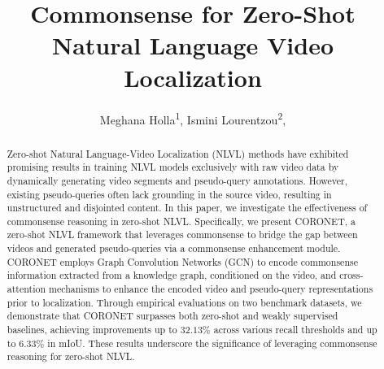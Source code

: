 \documentclass[letterpaper]{article} %
\title{Commonsense for Zero-Shot Natural Language Video Localization}
\author {
    Meghana Holla\textsuperscript{\rm 1},
    Ismini Lourentzou\textsuperscript{\rm 2},
}
\newcommand*{\elbafont}{\fontfamily{augie}\selectfont}
\newcommand*\modelname{{\scriptsize \elbafont CORONET}\xspace}
\begin{document}
\maketitle

\begin{abstract}
Zero-shot Natural Language-Video Localization (NLVL) methods have exhibited promising results in training NLVL models exclusively with raw video data by dynamically generating video segments and pseudo-query annotations.
However, existing pseudo-queries often lack grounding in the source video, resulting in unstructured and disjointed content. In this paper, we investigate the effectiveness of commonsense reasoning in zero-shot NLVL. Specifically, we present \modelname, a zero-shot NLVL framework that leverages commonsense to bridge the gap between videos and generated pseudo-queries via a commonsense enhancement module. \modelname employs Graph Convolution Networks (GCN) to encode commonsense information extracted from a knowledge graph, conditioned on the video, and cross-attention mechanisms to enhance the encoded video and pseudo-query representations prior to localization. Through empirical evaluations on two benchmark datasets, we demonstrate that \modelname surpasses both zero-shot and weakly supervised baselines, achieving improvements up to $32.13\%$ across various recall thresholds and up to $6.33\%$ in mIoU. These results underscore the significance of leveraging commonsense reasoning for zero-shot NLVL.
\end{abstract}







{\small \clearpage
}
\appendix

\end{document}
